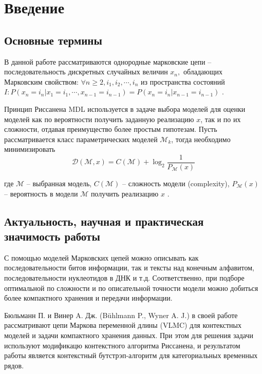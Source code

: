 \documentclass[12pt]{article}
\begin{document}
	
	\newpage
	
	\tableofcontents %
	
	\newpage
	
	\section{Введение}
	\subsection*{Основные термины}
	В данной работе рассматриваются однородные марковские цепи -- последовательность дискретных случайных величин ${x_n},$ обладающих Марковским свойством: $\forall n\ge2, i_1, i_2, \cdots, i_n$ из пространства состояний $I: P(x_n=i_n|x_1=i_1,\cdots,x_{n-1}=i_{n-1})=P(x_n=i_n|x_{n-1}=i_{n-1})$ \cite[c.~18]{markovchain}.
	
	Принцип Риссанена MDL используется в задаче выбора моделей для оценки моделей как по вероятности получить заданную реализацию $x$, так и по их сложности, отдавая преимущество более простым гипотезам. Пусть рассматривается класс параметрических моделей $\mathcal{M}_k$, тогда необходимо минимизировать \begin{equation}\label{eq:rissanenDL}\mathcal{D}(\mathcal{M},x) = C(\mathcal{M})+\log_2{\frac{1}{P_{\mathcal{M}}(x)}}\end{equation}
	
	где $\mathcal{M}$ -- выбранная модель, $C(\mathcal{M})$ -- сложность модели (complexity), $P_{\mathcal{M}}(x)$ -- вероятность в модели $\mathcal{M}$ получить реализацию $x$ \cite[с.~2751]{mdlmodeling}.
	
	\subsection*{Актуальность, научная и практическая значимость работы}
	С помощью моделей Марковских цепей можно описывать как последовательности битов информации, так и тексты над конечным алфавитом, последовательности нуклеотидов в ДНК и т.д. Соответственно, при подборе оптимальной по сложности и по описательной точности модели можно добиться более компактного хранения и передачи информации.
	
	Бюльманн П. и Винер A. Дж. (Bühlmann P., Wyner A. J.) в своей работе \cite{contextMarkovChains} рассматривают цепи Маркова переменной длины (VLMC) для контекстных моделей и задачи компактного хранения данных. При этом для решения задачи используют модификацю контекстного алгоритма Риссанена, и результатом работы является контекстный бутстрэп-алгоритм для категориальных временных рядов. 
	
\end{document}

